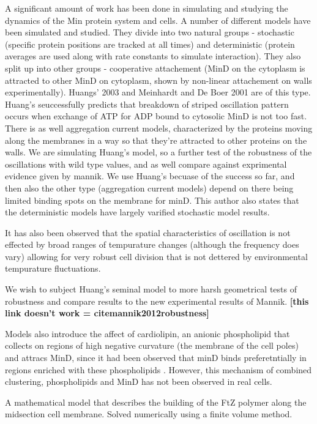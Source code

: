 \documentclass[letterpaper,twocolumn,amsmath,amssymb,pre]{revtex4-1}
\newcommand{\red}[1]{{\bf \color{red} #1}}
\newcommand{\fixme}[1]{\red{[#1]}}
\begin{document}
A significant amount of work has been done in simulating and studying
the dynamics of the Min protein system and cells. A number of
different models have been simulated and studied.  They divide into
two natural groups - stochastic (specific protein positions are
tracked at all times) and deterministic (protein averages are used
along with rate constants to simulate interaction). They also split up
into other groups - cooperative attachement (MinD on the cytoplasm is
attracted to other MinD on cytoplasm, shown by non-linear attachement
on walls experimentally).  Huangs' 2003 and Meinhardt and De Boer 2001
are of this type.  Huang's seuccessfully predicts that breakdown of
striped oscillation pattern occurs when exchange of ATP for ADP bound
to cytosolic MinD is not too fast.  There is as well aggregation
current models, characterized by the proteins moving along the
membranes in a way so that they're attracted to other proteins on the
walls.  We are simulating Huang's model, so a further test of the
robustness of the oscillations with wild type values, and as well
compare against exprimental evidence given by mannik.  We use Huang's
becuase of the success so far, and then also the other type
(aggregation current models) depend on there being limited binding
spots on the membrane for minD.  This author also states that the
deterministic models have largely varified stochastic model
results.\cite{kruse2007experimentalist}

It has also been observed that the spatial characteristics of
oscillation is not effected by broad ranges of tempurature changes
(although the frequency does vary) allowing for very robust cell
division that is not dettered by environmental tempurature
fluctuations. \cite{touhami2006temperature}

We wish to subject Huang's seminal model to more harsh geometrical
tests of robustness and compare results to the new experimental
results of Mannik.\fixme{this link doesn't work = cite{mannik2012robustness}}

Models also introduce the affect of cardiolipin, an anionic
phospholipid that collects on regions of high negative curvature (the
membrane of the cell poles) and attracs MinD, since it had been
observed that minD binds preferetntially in regions enriched with
these phospholipids \cite{drew2005polymerization}\cite{cytrynbaum2007multistranded}. However, this
mechanism of combined clustering, phospholipids and MinD has not been
observed in real cells.  \cite{halatek2012highly}

A mathematical model that describes the building of the FtZ polymer
along the midsection cell membrane.  Solved numerically using a finite
volume method. \cite{zhang2013mathematical}
\end{document}
